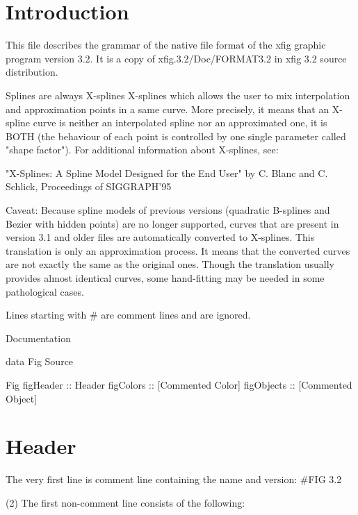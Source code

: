 \documentclass[10pt, a4paper]{article}
\begin{document}
\tableofcontents

\section{Introduction}

This file describes the grammar of the native file format of the xfig graphic
program version 3.2. 
It is a copy of xfig.3.2/Doc/FORMAT3.2 in xfig 3.2 source distribution. 



Splines are always X-splines 
X-splines which allows the user to mix interpolation and approximation
points in a same curve. More precisely, it means that an X-spline curve
is neither an interpolated spline nor an approximated one, it is BOTH
(the behaviour of each point is controlled by one single parameter
called "shape factor"). For additional information about X-splines, see:

  "X-Splines: A Spline Model Designed for the End User"
  by C. Blanc and C. Schlick, Proceedings of SIGGRAPH'95

Caveat: Because spline models of previous versions (quadratic B-splines
and Bezier with hidden points) are no longer supported, curves that are
present in version 3.1 and older files are automatically converted to
X-splines. This translation is only an approximation process. It means
that the converted curves are not exactly the same as the original ones.
Though the translation usually provides almost identical curves, some
hand-fitting may be needed in some pathological cases.

Lines starting with \# are comment lines and are ignored. 

Documentation

data Fig
Source

Fig	 
figHeader :: Header
figColors :: [Commented Color]
figObjects :: [Commented Object]


\section{Header}

The very first line is comment line containing the name and version:
        \#FIG 3.2


(2) The first non-comment line consists of the following:
\end{document}
